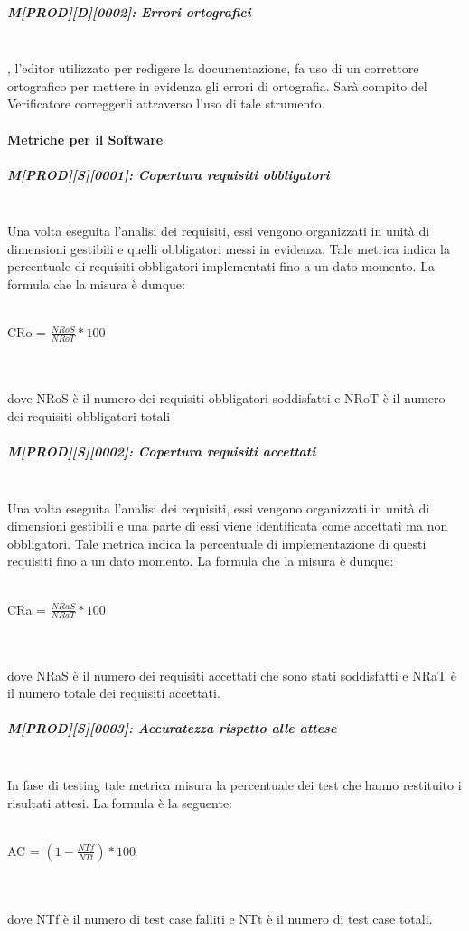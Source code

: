 \subparagraph{M[PROD][D][0002]: Errori ortografici}
~\\, l'editor utilizzato per redigere la documentazione, fa uso di un correttore ortografico per mettere in evidenza gli errori di ortografia. Sarà compito del Verificatore correggerli attraverso l'uso di tale strumento.

\paragraph{Metriche per il Software}
\subparagraph{M[PROD][S][0001]: Copertura requisiti obbligatori}
~\\Una volta eseguita l'analisi dei requisiti, essi vengono organizzati in unità di dimensioni gestibili e quelli obbligatori messi in evidenza. Tale metrica indica la percentuale di requisiti obbligatori implementati fino a un dato momento. La formula che la misura è dunque:
    \\\\
    \centerline{CRo = ${\displaystyle{\frac {NRoS}{NRoT}}*100}$}
    \\\\
dove NRoS è il numero dei requisiti obbligatori soddisfatti e NRoT è il numero dei requisiti obbligatori totali

\subparagraph{M[PROD][S][0002]: Copertura requisiti accettati}
~\\Una volta eseguita l'analisi dei requisiti, essi vengono organizzati in unità di dimensioni gestibili e una parte di essi viene identificata come accettati ma non obbligatori. Tale metrica indica la percentuale di implementazione di questi requisiti fino a un dato momento. La formula che la misura è dunque:
    \\\\
    \centerline{CRa = ${\displaystyle{\frac {NRaS}{NRaT}}*100}$}
    \\\\
dove NRaS è il numero dei requisiti accettati che sono stati soddisfatti e NRaT è il numero totale dei requisiti accettati.

\subparagraph{M[PROD][S][0003]: Accuratezza rispetto alle attese}
~\\In fase di testing tale metrica misura la percentuale dei test che hanno restituito i risultati attesi. La formula è la seguente:
    \\\\
    \centerline{AC = ${\displaystyle (1-{\frac {NTf}{NTt}})*100}$}
    \\\\
dove NTf è il numero di test case falliti e NTt è il numero di test case totali.

